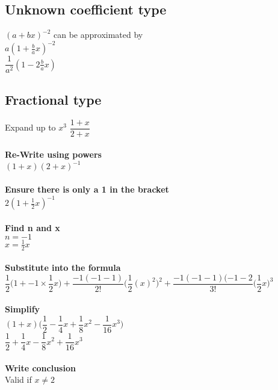 \documentclass{article}[18pt]
\begin{document}
\subsection{Unknown coefficient type}
$(a+bx)^{-2}$ can be approximated by\\
$a(1+\frac{b}{a}x)^{-2}$\\
$\dfrac{1}{a^2}(1-2\frac{b}{a}x)$\\
\subsection{Fractional type}
Expand up to $x^3$ $\dfrac{1+x}{2+x}$\\
\\
\textbf{Re-Write using powers}\\
$(1+x)(2+x)^{-1}$\\
\\
\textbf{Ensure there is only a 1 in the bracket}\\
$2(1+\frac{1}{2}x)^{-1}$\\
\\
\textbf{Find n and x}\\
$n=-1$\\
$x=\frac{1}{2}x$\\
\\
\textbf{Substitute into the formula}\\
$\dfrac{1}{2}\Bigg(1+-1\times\dfrac{1}{2}x\Bigg)+\dfrac{-1(-1-1)}{2!}\Bigg(\dfrac{1}{2}(x)^2\Bigg)^2+\dfrac{-1(-1-1)(-1-2}{3!}\Bigg(\dfrac{1}{2}x\Bigg)^3$\\
\\
\textbf{Simplify}\\
$(1+x)\Bigg(\dfrac{1}{2}-\dfrac{1}{4}x+\dfrac{1}{8}x^2-\dfrac{1}{16}x^3\Bigg)$\\
$\dfrac{1}{2}+\dfrac{1}{4}x-\dfrac{1}{8}x^2+\dfrac{1}{16}x^3$\\
\\
\textbf{Write conclusion}\\
Valid if $x\neq2$\\
\newpage
\end{document}

